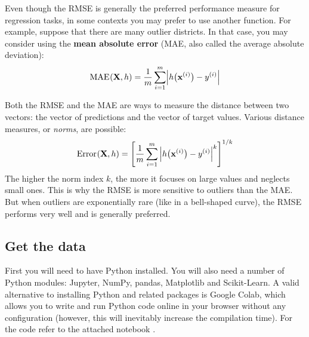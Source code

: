 Even though the RMSE is generally the preferred performance measure for regression tasks, in some contexts you may prefer to use another function. For example, suppose that there are many outlier districts. In that case, you may consider using the \textbf{mean absolute error} (MAE, also called the average absolute deviation):
\begin{equation}\label{MAE}
\operatorname{MAE}\mspace{1mu}(\mathbf{X},h)=\frac{1}{m}\sum_{i=1}^m\Bigl\lvert h\bigl(\mathbf{x}^{(i)}\bigr)-y^{(i)}\Bigr\rvert
\end{equation}

Both the RMSE and the MAE are ways to measure the distance between two vectors: the vector of predictions and the vector of target values. Various distance measures, or \emph{norms}, are possible:
\begin{equation}\label{norm}
\operatorname{Error}\mspace{1mu}(\mathbf{X},h)={\left[\frac{1}{m}\sum_{i=1}^m{\Bigl\lvert h\bigl(\mathbf{x}^{(i)}\bigr)-y^{(i)}\Bigr\rvert}^k\right]}^{1/k}
\end{equation}
The higher the norm index $k$, the more it focuses on large values and neglects small ones. This is why the RMSE is more sensitive to outliers than the MAE. But when outliers are exponentially rare (like in a bell-shaped curve), the RMSE performs very well and is generally preferred.
\subsection{Get the data}
First you will need to have Python installed. You will also need a number of Python modules: Jupyter, NumPy, pandas, Matplotlib and Scikit-Learn. A valid alternative to installing Python and related packages is Google Colab, which allows you to write and run Python code online in your browser without any configuration (however, this will inevitably increase the compilation time). For the code refer to the attached notebook .

